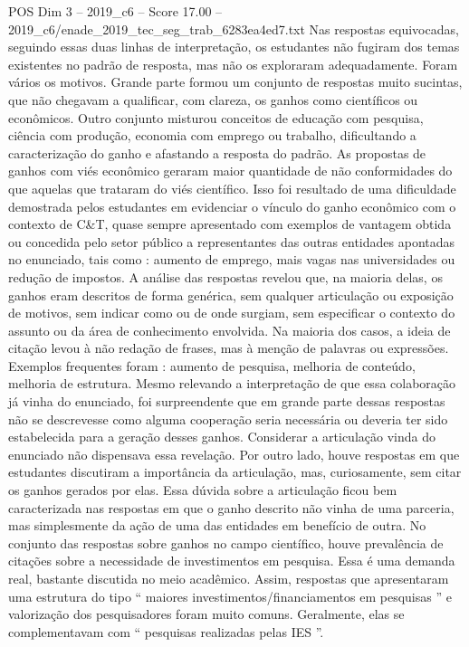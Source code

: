 \begin{textsample}{POS Dim 3 – 2019\_c6 – Score 17.00 – 2019\_c6/enade\_2019\_tec\_seg\_trab\_6283ea4ed7.txt}
Nas respostas equivocadas, seguindo essas duas linhas de interpretação, os estudantes não fugiram dos temas existentes no padrão de resposta, mas não os exploraram adequadamente.
Foram vários os motivos.
Grande parte formou um conjunto de respostas muito sucintas, que não chegavam a qualificar, com clareza, os ganhos como científicos ou econômicos.
Outro conjunto misturou conceitos de educação com pesquisa, ciência com produção, economia com emprego ou trabalho, dificultando a caracterização do ganho e afastando a resposta do padrão.
As propostas de ganhos com viés econômico geraram maior quantidade de não conformidades do que aquelas que trataram do viés científico.
Isso foi resultado de uma dificuldade demostrada pelos estudantes em evidenciar o vínculo do ganho econômico com o contexto de C\&T, quase sempre apresentado com exemplos de vantagem obtida ou concedida pelo setor público a representantes das outras entidades apontadas no enunciado, tais como : aumento de emprego, mais vagas nas universidades ou redução de impostos.
A análise das respostas revelou que, na maioria delas, os ganhos eram descritos de forma genérica, sem qualquer articulação ou exposição de motivos, sem indicar como ou de onde surgiam, sem especificar o contexto do assunto ou da área de conhecimento envolvida.
Na maioria dos casos, a ideia de citação levou à não redação de frases, mas à menção de palavras ou expressões.
Exemplos frequentes foram : aumento de pesquisa, melhoria de conteúdo, melhoria de estrutura.
Mesmo relevando a interpretação de que essa colaboração já vinha do enunciado, foi surpreendente que em grande parte dessas respostas não se descrevesse como alguma cooperação seria necessária ou deveria ter sido estabelecida para a geração desses ganhos.
Considerar a articulação vinda do enunciado não dispensava essa revelação.
Por outro lado, houve respostas em que estudantes discutiram a importância da articulação, mas, curiosamente, sem citar os ganhos gerados por elas.
Essa dúvida sobre a articulação ficou bem caracterizada nas respostas em que o ganho descrito não vinha de uma parceria, mas simplesmente da ação de uma das entidades em benefício de outra.
No conjunto das respostas sobre ganhos no campo científico, houve prevalência de citações sobre a necessidade de investimentos em pesquisa.
Essa é uma demanda real, bastante discutida no meio acadêmico.
Assim, respostas que apresentaram uma estrutura do tipo “ maiores investimentos/financiamentos em pesquisas ” e valorização dos pesquisadores foram muito comuns.
Geralmente, elas se complementavam com “ pesquisas realizadas pelas IES ”.

\end{textsample}
